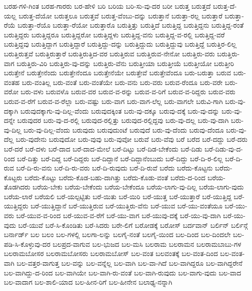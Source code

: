 {ಬರಹ-ಗಳಿ-ಗಿಂತ
ಬರಹ-ಗಾರರು
ಬರ-ಹೇಳಿ
ಬರಿ
ಬರಿಯ
ಬರಿ-ಸು-ವು-ದರ
ಬರೀ
ಬರುತ್ತ
ಬರುತ್ತದೆ
ಬರುತ್ತ-ದೆ-ಯಲ್ಲ
ಬರುತ್ತ-ದೆಯೋ
ಬರುತ್ತಲೂ
ಬರುತ್ತವೆ
ಬರುತ್ತ-ವೆಂಬು-ದನ್ನು
ಬರುತ್ತಾನೆ
ಬರುತ್ತಾ-ರಲ್ಲ
ಬರುತ್ತಾರೆ
ಬರುತ್ತಾ-ರೆಯೆ
ಬರುತ್ತಾ-ರೆಯೊ
ಬರುತ್ತಾ-ರೆಯೋ
ಬರುತ್ತಾರೊ
ಬರುತ್ತಿತ್ತು
ಬರುತ್ತಿದೆ
ಬರುತ್ತಿದ್ದ
ಬರುತ್ತಿದ್ದನು
ಬರುತ್ತಿದ್ದ-ರಂತೆ
ಬರುತ್ತಿದ್ದರು
ಬರುತ್ತಿದ್ದರೂ
ಬರುತ್ತಿದ್ದರೋ
ಬರುತ್ತಿದ್ದಳು
ಬರುತ್ತಿದ್ದ-ವನು
ಬರುತ್ತಿದ್ದ-ವ-ರಲ್ಲಿ
ಬರುತ್ತಿದ್ದ-ವರೆ
ಬರುತ್ತಿದ್ದವು
ಬರುತ್ತಿದ್ದಾಗ
ಬರುತ್ತಿದ್ದಾರೆ
ಬರುತ್ತಿದ್ದು-ದನ್ನು
ಬರುತ್ತಿದ್ದುದು
ಬರುತ್ತಿದ್ದುವು
ಬರುತ್ತಿದ್ದೆ
ಬರುತ್ತಿರ-ಲಿಲ್ಲ
ಬರುತ್ತಿರುತ್ತವೆ
ಬರುತ್ತಿರುತ್ತಾರೆ
ಬರುತ್ತಿರುತ್ತಿದ-ವರ
ಬರುತ್ತಿರುವ
ಬರುತ್ತಿರುವ-ನೇನೋ
ಬರುತ್ತಿರು-ವರು
ಬರುತ್ತಿರು-ವಾಗ
ಬರುತ್ತಿರು-ವಿರಿ
ಬರುತ್ತಿರು-ವು-ದನ್ನು
ಬರುತ್ತಿರು-ವೆನು
ಬರುತ್ತೀಯಾ
ಬರುತ್ತೀಯೆ
ಬರುತ್ತೀಯೋ
ಬರುತ್ತೀರಿ
ಬರುತ್ತೇನೆ
ಬರುತ್ತೇನೆಂದು
ಬರುತ್ತೇನೆಂದೂ
ಬರುತ್ತೇನೆಯೇ
ಬರುತ್ತೇವೆ
ಬರುತ್ತೇವೆಂದೂ
ಬರು-ಬರುತ್ತಾ
ಬರುವ
ಬರು-ವಂತಹ
ಬರು-ವಂತಿಲ್ಲ
ಬರು-ವಂತೆ
ಬರು-ವಂತೆಯೇ
ಬರು-ವನು
ಬರು-ವರು
ಬರುವ-ರೆಂದೂ
ಬರು-ವರೇ
ಬರು-ವರೋ
ಬರು-ವಳು
ಬರುವಳೊ
ಬರುವ-ವರ
ಬರುವ-ವ-ರನ್ನು
ಬರುವ-ವ-ರಿಗೆ
ಬರುವ-ವ-ರಿದ್ದರು
ಬರುವ-ವರು
ಬರುವ-ವ-ರೆಗೆ
ಬರುವ-ವ-ರೆಲ್ಲಾ
ಬರು-ವಷ್ಟು
ಬರು-ವಾಗ
ಬರು-ವಾಗ-ಲೆಲ್ಲ
ಬರು-ವಾಗಲೇ
ಬರುವಿ-ಗಾಗಿ
ಬರು-ವು-ದಕ್ಕಾಗಿ
ಬರುವುದಕ್ಕಾಗು-ವು-ದಿಲ್ಲ-ವೆಂದು
ಬರುವುದಕ್ಕಿಂತ
ಬರು-ವು-ದಕ್ಕೂ
ಬರುವು-ದಕ್ಕೆ
ಬರು-ವು-ದನ್ನು
ಬರು-ವು-ದನ್ನೇ
ಬರುವುದರ
ಬರು-ವು-ದ-ರಲ್ಲಿ
ಬರುವುದ-ರಲ್ಲಿತ್ತು
ಬರುವುದ-ರಲ್ಲಿದ್ದವು
ಬರು-ವು-ದಲ್ಲ
ಬರು-ವು-ದಾಗಿ
ಬರು-ವು-ದಿಲ್ಲ
ಬರು-ವು-ದಿಲ್ಲ-ವೆಂದು
ಬರುವುದು
ಬರುವುದುಂಟೆ
ಬರುವುದೆ
ಬರು-ವು-ದೆಂದು
ಬರುವು-ದೆಂದೂ
ಬರು-ವು-ದೆಲ್ಲ
ಬರು-ವುದೇನು
ಬರುವುದೋ
ಬರು-ವುವು
ಬರು-ವುವೋ
ಬರುವೆ
ಬರು-ವೆವು
ಬರೆ
ಬರೆದ
ಬರೆ-ದದ್ದು
ಬರೆ-ದರು
ಬರೆ-ದರೆ
ಬರೆ-ದಳು
ಬರೆ-ದಾದ
ಬರೆ-ದಾದ-ಮೇಲೆ
ಬರೆ-ದಿಟ್ಟು
ಬರೆ-ದಿಡ-ಬೇಕೆಂದು
ಬರೆ-ದಿಡು
ಬರೆ-ದಿಡು-ವು-ದ-ರಿಂದ
ಬರೆ-ದಿತ್ತು
ಬರೆ-ದಿದ್ದ
ಬರೆ-ದಿದ್ದರು
ಬರೆ-ದಿದ್ದಾನೆ
ಬರೆ-ದಿದ್ದಾನೆಂಬುದು
ಬರೆ-ದಿದ್ದು
ಬರೆ-ದಿ-ರ-ಲಿಲ್ಲ
ಬರೆ-ದಿ-ರುವ
ಬರೆ-ದಿ-ರು-ವನು
ಬರೆ-ದಿ-ರು-ವರು
ಬರೆ-ದಿ-ರುವುದು
ಬರೆ-ದಿ-ರುವೆ
ಬರೆದು
ಬರೆದು-ಕೊಟ್ಟನು
ಬರೆದು-ಕೊಟ್ಟರು
ಬರೆದು-ಕೊಟ್ಟು
ಬರೆದು-ಕೊಡ-ಬಹು-ದಾಗಿತ್ತು
ಬರೆದು-ಕೊಡು-ವಂತೆ
ಬರೆದು-ದ-ರಿಂದ
ಬರೆಯ-ತೊಡಗಿದರು
ಬರೆಯ-ಬೇಕು
ಬರೆಯ-ಬೇಕೆಂದು
ಬರೆಯ-ಬೇಕೆಂದೂ
ಬರೆಯ-ಲಾಗು-ವು-ದಿಲ್ಲ
ಬರೆಯ-ಲಾಗು-ವುದು
ಬರೆಯ-ಲಾರೆ
ಬರೆಯಲಿ
ಬರೆ-ಯಲ್ಪಟ್ಟಿತು
ಬರೆ-ಯಿತು
ಬರೆ-ಯಿರಿ
ಬರೆ-ಯುತ್ತ
ಬರೆ-ಯುತ್ತಾರೆ
ಬರೆ-ಯುತ್ತಿದ್ದ
ಬರೆ-ಯುತ್ತಿದ್ದರು
ಬರೆ-ಯುತ್ತಿದ್ದಾನೆ
ಬರೆ-ಯುತ್ತಿರುವ
ಬರೆ-ಯುತ್ತಿರು-ವೆನು
ಬರೆ-ಯುವ
ಬರೆ-ಯು-ವಂತೆಯೂ
ಬರೆ-ಯು-ವರು
ಬರೆ-ಯುವ-ವ-ರಿಂದ
ಬರೆ-ಯುವ-ವ-ರೆಗೆ
ಬರೆ-ಯು-ವಾಗ
ಬರೆ-ಯುವು-ದಕ್ಕೆ
ಬರೆ-ಯು-ವು-ದಾಗಿ
ಬರೆ-ಯು-ವುದು
ಬರೆ-ಯುವೆ
ಬರೆ-ಸಿ-ಕೊಂಡಿತು
ಬರೆ-ಸಿದರು
ಬರೇ-ಲಿಗೆ
ಬರೋಡಕ್ಕೆ
ಬರೋಸ್
ಬರ್ದವಾನ್
ಬರ್ಲಿನ್
ಬರ್ಲಿನ್ಗೆ
ಬರ್ನಾರ್ಡ್
ಬಲ
ಬಲಂ
ಬಲ-ಗಳಲ್ಲಿ
ಬಲಗಾ-ಲನ್ನು
ಬಲಗೈ-ನಂತೆ
ಬಲಗೈ-ಯಿಂದ
ಬಲ-ದಿಂದ
ಬಲ-ದಿಂದಲೇ
ಬಲ-ಪಡಿ-ಸಿ-ಕೊಳ್ಳುವು-ದರ
ಬಲಪ್ರದ-ವಾಗುವ
ಬಲ-ಭುಜದ
ಬಲ-ಮಸಿ
ಬಲರಾಮ
ಬಲರಾಮನ
ಬಲರಾಮಬಾಬು-ಗಳ
ಬಲರಾಮಬೋಸರ
ಬಲರಾಮಬೋಸರು
ಬಲರಾಮಬೋಸ್
ಬಲ-ವಂತ
ಬಲವಂತಕ್ಕೆ
ಬಲ-ವಂತ-ದಿಂದ
ಬಲ-ವಂತ-ವಾಗಿ
ಬಲ-ವತ್ತರ-ವಾಗುತ್ತ
ಬಲ-ವನ್ನು
ಬಲ-ವನ್ನೆಲ್ಲ
ಬಲ-ವಾಗಿ
ಬಲ-ವಾ-ಗಿದೆ
ಬಲ-ವಾಗಿದ್ದರೂ
ಬಲ-ವಾಗಿದ್ದರೇನೆ
ಬಲ-ವಾಗಿದ್ದು-ದ-ರಿಂದ
ಬಲ-ವಾಗಿಯೇ
ಬಲ-ವಾಗಿ-ರು-ವಂತೆ
ಬಲ-ವಾಗಿ-ರುವುದು
ಬಲ-ವಾಗು-ವುದು
ಬಲ-ವಾದ
ಬಲ-ವಾದಾಗ
ಬಲ-ಶಾಲಿ-ಯಾದ
ಬಲ-ಹೀನ-ರಿಗೆ
ಬಲ-ಹೀನೇನ
ಬಲಾಢ್ಯ-ನನ್ನಾಗಿ
}
